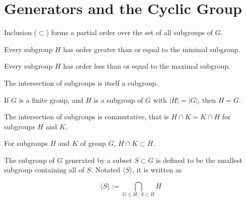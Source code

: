 \section{Generators and the Cyclic Group}

\begin{theorem}
    \label{theorem : PartialOrder (Subgroup G)}
    Inclusion ($\subset$) forms a partial order over the set of all subgroups of $G$.
\end{theorem}

\begin{theorem}
    \label{theorem : Minimal_smallest}
    \leanok
    Every subgroup $H$ has order greater than or equal to the minimal subgroup.
\end{theorem}

\begin{theorem}
    \label{theorem : Maximal_largest}
    \leanok
    Every subgroup $H$ has order less than or equal to the maximal subgroup.
\end{theorem}

\begin{theorem}
    \label{definition : Intersect}
    \leanok
    The intersection of subgroups is itself a subgroup.
\end{theorem}

\begin{theorem}
    \label{definition : subgroup_eq_Maximal_of_card_eq_G}
    If $G$ is a finite group, and $H$ is a subgroup of $G$ with $|H| = |G|$, then $H = G$.
\end{theorem}

\begin{theorem}
    \label{theorem : inter_comm}
    The intersection of subgroups is commutative, that is $H \cap K = K \cap H$ for subgroups $H$ and $K$.
\end{theorem}

\begin{theorem}
    \label{theorem : le_intersect_self}
    For subgroups $H$ and $K$ of group $G$, $H \cap K \subset H$.
\end{theorem}

\begin{definition}
    \label{definition : Generate}
    \leanok
    The subgroup of $G$ generated by a subset $S \subset G$ is defined to be the smallest subgroup containing all of $S$. Notated $\langle S \rangle$, it is written as

    \begin{equation*}
        \langle S \rangle := \bigcap_{G \le H;\; S \subset H} H
    \end{equation*}
\end{definition}

